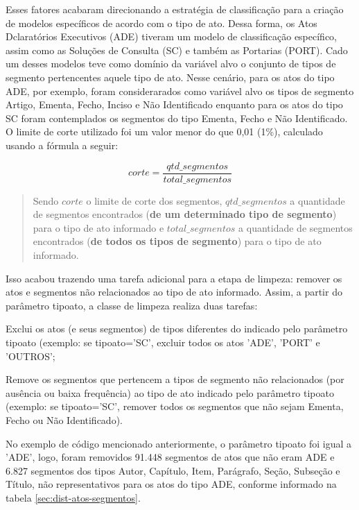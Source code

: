 Esses fatores acabaram direcionando a estratégia de classificação para a criação de modelos específicos de acordo com o tipo de ato. Dessa forma, os Atos Dclaratórios Executivos (ADE) tiveram um modelo de classificação específico, assim como as Soluções de Consulta (SC) e também as Portarias (PORT). Cado um desses modelos teve como domínio da variável alvo o conjunto de tipos de segmento pertencentes aquele tipo de ato. Nesse cenário, para os atos do tipo ADE, por exemplo, foram considerarados como variável alvo os tipos de segmento Artigo, Ementa, Fecho, Inciso e Não Identificado enquanto para os atos do tipo SC foram contemplados os segmentos do tipo Ementa, Fecho e Não Identificado. O limite de corte utilizado foi um valor menor do que 0,01 (1\%), calculado usando a fórmula a seguir:

\[ corte = \frac{qtd\_segmentos}{total\_segmentos} \]

\begin{quote}
Sendo \( corte \) o limite de corte dos segmentos, \( qtd\_segmentos \) a quantidade de segmentos encontrados (\textbf{de um determinado tipo de segmento}) para o tipo de ato informado e \( total\_segmentos \) a quantidade de segmentos encontrados (\textbf{de todos os tipos de segmento}) para o tipo de ato informado.
\end{quote}

Isso acabou trazendo uma tarefa adicional para a etapa de limpeza: remover os atos e segmentos não relacionados ao tipo de ato informado. Assim, a partir do parâmetro tipo\textunderscore ato, a classe de limpeza realiza duas tarefas: 
\begin{alineas}
	\item Exclui os atos (e seus segmentos) de tipos diferentes do indicado pelo parâmetro tipo\textunderscore ato (exemplo: se tipo\textunderscore ato='SC', excluir todos os atos 'ADE', 'PORT' e 'OUTROS';
	\item Remove os segmentos que pertencem a tipos de segmento não relacionados (por ausência ou baixa frequência) ao tipo de ato indicado pelo parâmetro tipo\textunderscore ato (exemplo: se tipo\textunderscore ato='SC', remover todos os segmentos que não sejam Ementa, Fecho ou Não Identificado).
\end{alineas}

No exemplo de código mencionado anteriormente, o parâmetro tipo\textunderscore ato foi igual a 'ADE', logo, foram removidos 91.448 segmentos de atos que não eram ADE e 6.827 segmentos dos tipos Autor, Capítulo, Item, Parágrafo, Seção, Subseção e Título, não representativos para os atos do tipo ADE, conforme informado na tabela \ref{sec:dist-atos-segmentos}. 